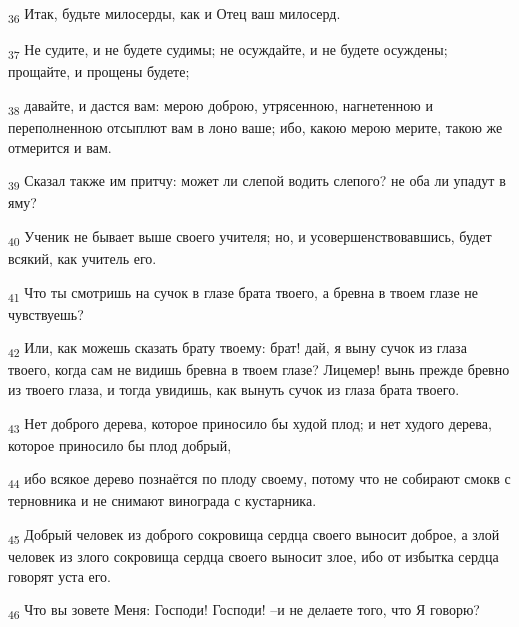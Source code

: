 \begin{tcolorbox}
\textsubscript{36} Итак, будьте милосерды, как и Отец ваш милосерд.
\end{tcolorbox}
\begin{tcolorbox}
\textsubscript{37} Не судите, и не будете судимы; не осуждайте, и не будете осуждены; прощайте, и прощены будете;
\end{tcolorbox}
\begin{tcolorbox}
\textsubscript{38} давайте, и дастся вам: мерою доброю, утрясенною, нагнетенною и переполненною отсыплют вам в лоно ваше; ибо, какою мерою мерите, такою же отмерится и вам.
\end{tcolorbox}
\begin{tcolorbox}
\textsubscript{39} Сказал также им притчу: может ли слепой водить слепого? не оба ли упадут в яму?
\end{tcolorbox}
\begin{tcolorbox}
\textsubscript{40} Ученик не бывает выше своего учителя; но, и усовершенствовавшись, будет всякий, как учитель его.
\end{tcolorbox}
\begin{tcolorbox}
\textsubscript{41} Что ты смотришь на сучок в глазе брата твоего, а бревна в твоем глазе не чувствуешь?
\end{tcolorbox}
\begin{tcolorbox}
\textsubscript{42} Или, как можешь сказать брату твоему: брат! дай, я выну сучок из глаза твоего, когда сам не видишь бревна в твоем глазе? Лицемер! вынь прежде бревно из твоего глаза, и тогда увидишь, как вынуть сучок из глаза брата твоего.
\end{tcolorbox}
\begin{tcolorbox}
\textsubscript{43} Нет доброго дерева, которое приносило бы худой плод; и нет худого дерева, которое приносило бы плод добрый,
\end{tcolorbox}
\begin{tcolorbox}
\textsubscript{44} ибо всякое дерево познаётся по плоду своему, потому что не собирают смокв с терновника и не снимают винограда с кустарника.
\end{tcolorbox}
\begin{tcolorbox}
\textsubscript{45} Добрый человек из доброго сокровища сердца своего выносит доброе, а злой человек из злого сокровища сердца своего выносит злое, ибо от избытка сердца говорят уста его.
\end{tcolorbox}
\begin{tcolorbox}
\textsubscript{46} Что вы зовете Меня: Господи! Господи! --и не делаете того, что Я говорю?
\end{tcolorbox}
